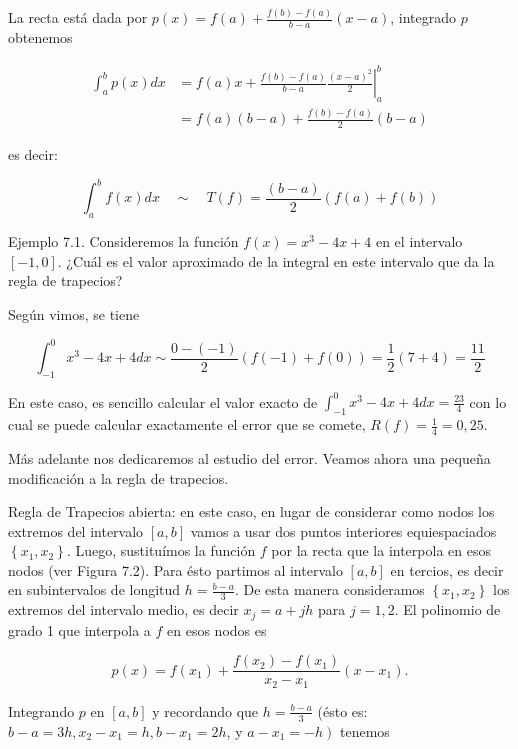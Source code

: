 \documentclass[10pt]{book}
\begin{document}
La recta está dada por $p(x)=f(a)+\frac{f(b)-f(a)}{b-a}(x-a)$, integrado $p$ obtenemos

$$
\begin{aligned}
\int_{a}^{b} p(x) d x & =f(a) x+\left.\frac{f(b)-f(a)}{b-a} \frac{(x-a)^{2}}{2}\right|_{a} ^{b} \\
& =f(a)(b-a)+\frac{f(b)-f(a)}{2}(b-a)
\end{aligned}
$$

es decir:


\begin{equation*}
\int_{a}^{b} f(x) d x \quad \sim \quad T(f)=\frac{(b-a)}{2}(f(a)+f(b)) \tag{7.2}
\end{equation*}


Ejemplo 7.1. Consideremos la función $f(x)=x^{3}-4 x+4$ en el intervalo $[-1,0]$. ¿Cuál es el valor aproximado de la integral en este intervalo que da la regla de trapecios?

Según vimos, se tiene

$$
\int_{-1}^{0} x^{3}-4 x+4 d x \sim \frac{0-(-1)}{2}(f(-1)+f(0))=\frac{1}{2}(7+4)=\frac{11}{2}
$$

En este caso, es sencillo calcular el valor exacto de $\int_{-1}^{0} x^{3}-4 x+4 d x=\frac{23}{4}$ con lo cual se puede calcular exactamente el error que se comete, $R(f)=\frac{1}{4}=0,25$.

Más adelante nos dedicaremos al estudio del error. Veamos ahora una pequeña modificación a la regla de trapecios.

Regla de Trapecios abierta: en este caso, en lugar de considerar como nodos los extremos del intervalo $[a, b]$ vamos a usar dos puntos interiores equiespaciados $\left\{x_{1}, x_{2}\right\}$. Luego, sustituímos la función $f$ por la recta que la interpola en esos nodos (ver Figura 7.2). Para ésto partimos al intervalo $[a, b]$ en tercios, es decir en subintervalos de longitud $h=\frac{b-a}{3}$. De esta manera consideramos $\left\{x_{1}, x_{2}\right\}$ los extremos del intervalo medio, es decir $x_{j}=a+j h$ para $j=1,2$. El polinomio de grado 1 que interpola a $f$ en esos nodos es

$$
p(x)=f\left(x_{1}\right)+\frac{f\left(x_{2}\right)-f\left(x_{1}\right)}{x_{2}-x_{1}}\left(x-x_{1}\right) .
$$

Integrando $p$ en $[a, b]$ y recordando que $h=\frac{b-a}{3}$ (ésto es: $b-a=3 h, x_{2}-x_{1}=h, b-x_{1}=2 h$, y $\left.a-x_{1}=-h\right)$ tenemos
\end{document}
